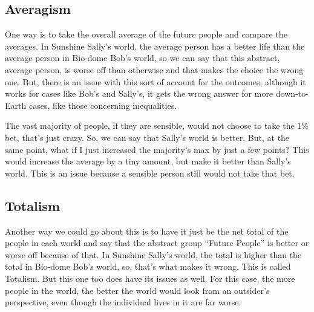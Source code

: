 \subsection{Averagism}

One way is to take the overall average of the future people and compare the averages. In Sunshine Sally’s world, the average person has a better life than the average person in Bio-dome Bob’s world, so we can say that this abstract, average person, is worse off than otherwise and that makes the choice the wrong one. But, there is an issue with this sort of account for the outcomes, although it works for cases like Bob's and Sally's, it gets the wrong answer for more down-to-Earth cases, like those concerning inequalities. 


The vast majority of people, if they are sensible, would not choose to take the 1\% bet, that's just crazy. So, we can say that Sally's world is better. But, at the same point, what if I just increased the majority's max by just a few points? This would increase the average by a tiny amount, but make it better than Sally's world. This is an issue because a sensible person still would not take that bet. 
\subsection{Totalism}

Another way we could go about this is to have it just be the net total of the people in each world and say that the abstract group “Future People” is better or worse off because of that. In Sunshine Sally’s world, the total is higher than the total in Bio-dome Bob’s world, so, that’s what makes it wrong. This is called Totalism. But this one too does have its issues as well. For this case, the more people in the world, the better the world would look from an outsider's perspective, even though the individual lives in it are far worse.

